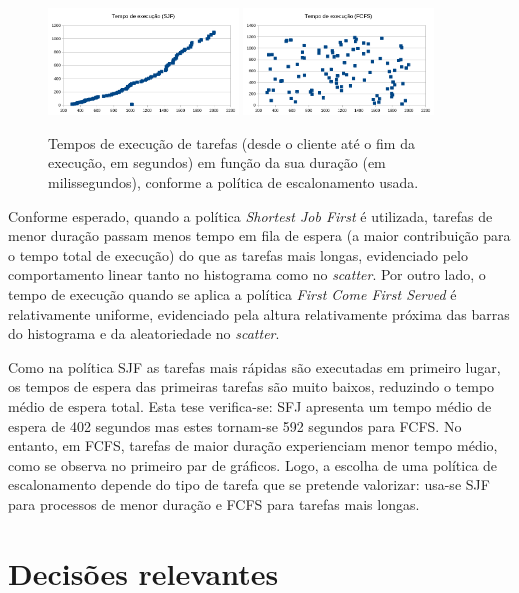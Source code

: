 \documentclass[11pt]{article}
\begin{document}
\begin{figure}[H]
    \centering
    \includegraphics[width=0.45\textwidth]{report_figures/ScatterSJF.png}
    \includegraphics[width=0.45\textwidth]{report_figures/ScatterFCFS.png}
    \caption{Tempos de execução de tarefas (desde o cliente até o fim da execução, em segundos) em
        função da sua duração (em milissegundos), conforme a política de escalonamento usada.}
\end{figure}

Conforme esperado, quando a política \emph{Shortest Job First} é utilizada, tarefas de menor duração
passam menos tempo em fila de espera (a maior contribuição para o tempo total de execução) do que as
tarefas mais longas, evidenciado pelo comportamento linear tanto no histograma como no
\emph{scatter}. Por outro lado, o tempo de execução quando se aplica a política \emph{First Come
First Served} é relativamente uniforme, evidenciado pela altura relativamente próxima das barras do
histograma e da aleatoriedade no \emph{scatter}.

Como na política SJF as tarefas mais rápidas são executadas em primeiro lugar, os tempos de espera
das primeiras tarefas são muito baixos, reduzindo o tempo médio de espera total. Esta tese
verifica-se: SFJ apresenta um tempo médio de espera de 402 segundos mas estes tornam-se 592 segundos
para FCFS. No entanto, em FCFS, tarefas de maior duração experienciam menor tempo médio, como se
observa no primeiro par de gráficos. Logo, a escolha de uma política de escalonamento depende do
tipo de tarefa que se pretende valorizar: usa-se SJF para processos de menor duração e FCFS para
tarefas mais longas.

\section{Decisões relevantes}
\end{document}
